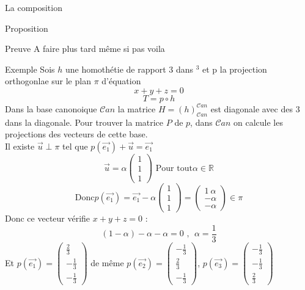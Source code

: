 \begin{parag}{La composition}
\begin{subparag}{Proposition}
    \end{subparag}
    \begin{subparag}{Preuve}
        A faire plus tard même si pas voila
    \end{subparag}
    \begin{subparag}{Exemple}
        Sois $h$ une homothétie de rapport $3$ dans \R$^3$ et p la projection orthogonlae sur le plan $\pi$ d'équation
        \[x + y + z = 0\]
        \[T = p \circ h\]
        Dans la base canonoique $\mathcal{C}an$ la matrice $H = (h)_{\mathcal{C}an}^{\mathcal{C}an}$ est diagonale avec des $3$ dans la diagonale. Pour trouver la matrice $P$ de $p$, dans $\mathcal{C}an$ on calcule les projections des vecteurs de cette base.\\
        Il existe $\vec{u}\perp \pi$ tel que $p(\vec{e_1}) + \vec{u} = \vec{e_1}$
        \[\vec{u} = \alpha\begin{pmatrix}
            1 \\ 1 \\ 1
        \end{pmatrix} \text{ Pour tout} \alpha \in \mathbb{R}\]
        \[\text{Donc} p(\vec{e_1}) = \vec{e_1} - \alpha \begin{pmatrix}
            1 \\ 1 \\ 1
        \end{pmatrix} = \begin{pmatrix}
            1 \ \alpha \\ -\alpha \\ -\alpha 
        \end{pmatrix} \in \pi\]
        Donc ce vecteur vérifie $x + y + z = 0$ :
        \[(1 - \alpha) - \alpha - \alpha = 0 \text{ , } \; \alpha = \frac{1}{3}    \]
        Et $p(\vec{e_1}) = \begin{pmatrix}
            \frac{2}{3} \\ -\frac{1}{3} \\ -\frac{1}{3}
        \end{pmatrix}$ de même $p(\vec{e_2}) = \begin{pmatrix}
            -\frac{1}{3} \\ \frac{2}{3} \\ -\frac{1}{3}
        \end{pmatrix}$, $p(\vec{e_3}) = \begin{pmatrix}
            -\frac{1}{3} \\ - \frac{1}{3} \\ \frac{2}{3} 
        \end{pmatrix}$

\end{subparag}
\end{parag}
